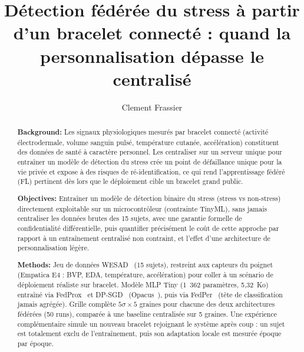\documentclass{acmart}
\begin{document}
\title[FL sur WESAD : la personnalisation dépasse le centralisé]{Détection fédérée du stress à partir d'un bracelet connecté : quand la personnalisation dépasse le centralisé}

\author{Clement Frassier}

\begin{abstract}
{\bf Background:}
Les signaux physiologiques mesurés par bracelet connecté (activité
électrodermale, volume sanguin pulsé, température cutanée, accélération)
constituent des données de santé à caractère personnel. Les centraliser sur un
serveur unique pour entraîner un modèle de détection du stress crée un point
de défaillance unique pour la vie privée et expose à des risques de
ré-identification, ce qui rend l'apprentissage fédéré (FL) pertinent dès lors
que le déploiement cible un bracelet grand public.

{\bf Objectives:}
Entraîner un modèle de détection binaire du stress (stress vs non-stress)
directement exploitable sur un microcontrôleur (contrainte TinyML), sans
jamais centraliser les données brutes des 15 sujets, avec une garantie
formelle de confidentialité différentielle, puis quantifier précisément le
coût de cette approche par rapport à un entraînement centralisé non contraint,
et l'effet d'une architecture de personnalisation légère.

{\bf Methods:}
Jeu de données WESAD~\cite{schmidt2018wesad} (15 sujets), restreint aux
capteurs du poignet (Empatica E4 : BVP, EDA, température, accélération) pour
coller à un scénario de déploiement réaliste sur bracelet. Modèle MLP Tiny
(1~362 paramètres, 5,32~Ko) entraîné via FedProx~\cite{li2020fedprox} et
DP-SGD~\cite{abadi2016deep} (Opacus~\cite{opacus}), puis via
FedPer~\cite{arivazhagan2019federated} (tête de classification jamais
agrégée). Grille complète $5\sigma \times 5$ graines pour chacune des deux
architectures fédérées (50 runs), comparée à une baseline centralisée sur 5
graines. Une expérience complémentaire simule un nouveau bracelet rejoignant
le système après coup : un sujet est totalement exclu de l'entraînement, puis
son adaptation locale est mesurée époque par époque.


\end{abstract}
\end{document}
